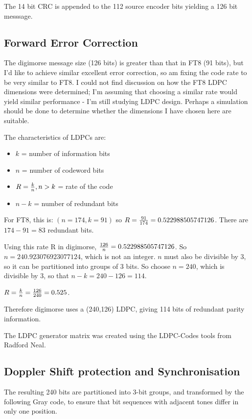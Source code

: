 \documentclass[a4paper]{tufte-handout}
\begin{document}
The 14 bit CRC is appended to the 112 source encoder bits yielding a 126 bit messsage.

\subsection{Forward Error Correction}
The digimorse message size (126 bits) is greater than that in FT8 (91 bits), but I'd like to achieve similar excellent error
correction, so am fixing the code rate to be very similar to FT8. I could not find discussion on how the FT8 LDPC
dimensions were determined; I'm assuming that choosing a similar rate would yield similar performance - I'm still
studying LDPC design. Perhaps a simulation should be done to determine whether the dimensions I have chosen here
are suitable.

The characteristics of LDPCs are:
\begin{itemize}
    \setlength\itemsep{-0.5em}
    \item $k$ = number of information bits
    \item $n$ = number of codeword bits
    \item $R={k \over n}, n>k$ = rate of the code
    \item $n-k$ = number of redundant bits
\end{itemize}

For FT8, this is: $(n=174,k=91)$ so $R={91 \over 174}=0.522988505747126$. There are $174-91=83$ redundant bits.

Using this rate R in digimorse, ${126 \over n}=0.522988505747126$. So $n=240.923076923077124$, which is not an integer. $n$ must
also be divisible by 3, so it can be partitioned into groups of 3 bits. So choose $n=240$, which is divisible by 3, so
that $n-k = 240 - 126 = 114.$

$R={k \over n} = {126 \over 240} = 0.525$. 

Therefore digimorse uses a (240,126) LDPC, giving 114 bits of redundant parity information.

The LDPC generator matrix was created using the LDPC-Codes tools from Radford Neal.

\subsection{Doppler Shift protection and Synchronisation}
The resulting 240 bits are partitioned into 3-bit groups, and transformed by the following Gray code, to ensure that
bit sequences with adjacent tones differ in only one position.
\end{document}
